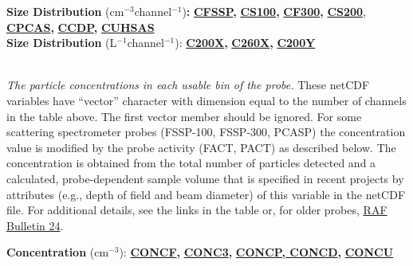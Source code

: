 \begin{hangparagraphs}
\textbf{}%
\noindent\begin{minipage}[t]{1\columnwidth}%
\textbf{Size Distribution} ($\mathrm{cm}{}^{-3}$channel$^{-1}$)\textbf{:}\textbf{
}\textbf{\uline{CFSSP}}\textbf{,
}\textbf{\uline{CS100}}\textbf{}\textbf{,
}\textbf{\uline{CF300}}\textbf{,
}\textbf{\uline{CS200}},\textbf{
}\textbf{\uline{CPCAS}}\textbf{,
}\textbf{\uline{CCDP}}\textbf{,
}\textbf{\uline{CUHSAS}}\\
\textbf{Size Distribution }(L\textbf{$^{-1}$}channel$^{-1}$):\textbf{
}\textbf{\uline{C200X}}\textbf{,
}\textbf{\uline{C260X}}\textbf{,
}\textbf{\uline{C200Y}}%
\end{minipage}\textbf{\label{CUHSAS}}\\
\emph{The particle concentrations}
\emph{in each usable bin of the probe.} These netCDF variables have
``vector'' character with dimension equal to the number of channels
in the table above. The first vector member should be ignored. For
some scattering spectrometer
probes (FSSP-100, FSSP-300, PCASP)
the concentration value is modified by the probe activity (FACT, PACT)
as described below. The concentration is obtained from the total number
of particles detected and a calculated, probe-dependent sample volume
that is specified in recent projects by attributes (e.g., depth of
field and beam diameter) of this variable in the netCDF file. For
additional details, see the links in the table 
or, for older probes, \href{https://opensky.ucar.edu/islandora/object/archives\%3A8155}{RAF Bulletin 24}.

\begin{singlespace}
\textbf{}%
\noindent\begin{minipage}[t]{1\columnwidth}%
\begin{hangparagraphs}
\begin{singlespace}
\textbf{Concentration }(cm$^{-3}$):\textbf{
}\textbf{\uline{CONCF}}\textbf{,
}\textbf{\uline{CONC3}}\textbf{,
}\textbf{\uline{CONCP, CONCD}}\textbf{,
}\textbf{\uline{CONCU}}


\end{singlespace}
\end{hangparagraphs}
\end{minipage}
\end{singlespace}
\end{hangparagraphs}
